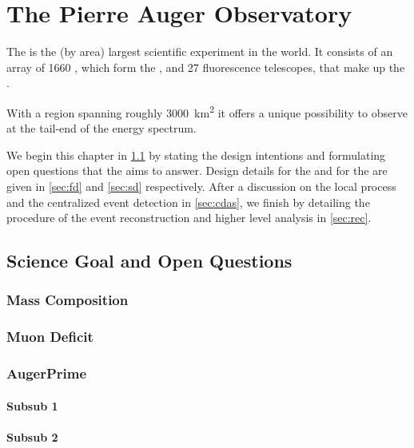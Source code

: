 
\chapter{The Pierre Auger Observatory}
\label{chap:pierre-auger-observatory}

The \PAO is the (by area) largest scientific experiment in the world. It 
consists of an array of 1660 \WCDs, which form the \SD, and 27 fluorescence 
telescopes, that make up the \FD.

With a region spanning roughly \SI{3000}{\kilo\meter\squared} it offers a unique
possibility to observe \UHECRs at the tail-end of the \CR energy spectrum. 

We begin this chapter in \cref{sec:science-case} by stating the design 
intentions and formulating open questions that the \PAO aims to answer. Design
details for the \FD and for the \SD are given in \cref{sec:fd} and \cref{sec:sd} 
respectively. After a discussion on the local \DAQ process and the centralized 
event detection in \cref{sec:cdas}, we finish by detailing the procedure of the
event reconstruction and higher level analysis in \cref{sec:rec}.

\section{Science Goal and Open Questions}
\label{sec:science-case}

\blindtext

\subsection{Mass Composition}

\blindtext
\subsection{Muon Deficit}

\blindtext
\subsection{AugerPrime}

\blindtext

\subsubsection{Subsub 1}
\blindtext

\subsubsection{Subsub 2}
\blindtext




